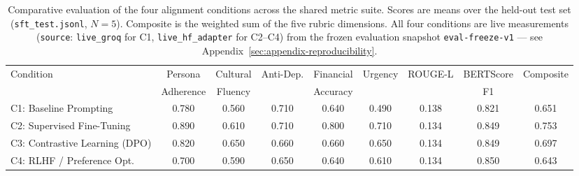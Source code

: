 \begin{table}[ht]
\centering
\caption{Comparative evaluation of the four alignment conditions across the shared metric suite. Scores are means over the held-out test set (\texttt{sft\_test.jsonl}, $N=5$). Composite is the weighted sum of the five rubric dimensions. All four conditions are live measurements (\texttt{source}: \texttt{live\_groq} for C1, \texttt{live\_hf\_adapter} for C2--C4) from the frozen evaluation snapshot \texttt{eval-freeze-v1} — see Appendix~\ref{sec:appendix-reproducibility}.}
\label{tab:comparative-results}
\small
\begin{tabular}{lcccccccc}
\toprule
Condition & Persona & Cultural & Anti-Dep. & Financial & Urgency & ROUGE-L & BERTScore & Composite \\
& Adherence & Fluency & & Accuracy & & & F1 & \\
\midrule
C1: Baseline Prompting & 0.780 & 0.560 & 0.710 & 0.640 & 0.490 & 0.138 & 0.821 & 0.651 \\
C2: Supervised Fine-Tuning & 0.890 & 0.610 & 0.710 & 0.800 & 0.710 & 0.134 & 0.849 & 0.753 \\
C3: Contrastive Learning (DPO) & 0.820 & 0.650 & 0.660 & 0.660 & 0.650 & 0.134 & 0.849 & 0.697 \\
C4: RLHF / Preference Opt. & 0.700 & 0.590 & 0.650 & 0.640 & 0.610 & 0.134 & 0.850 & 0.643 \\
\bottomrule
\end{tabular}
\end{table}
